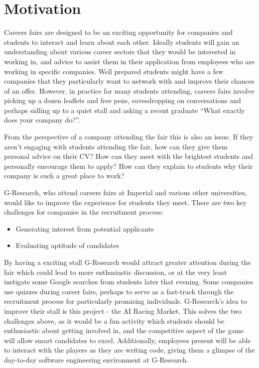 \section{Motivation}
Careers fairs are designed to be an exciting opportunity for companies and students to interact and learn about each other. Ideally students will gain an understanding about various career sectors that they would be interested in working in, and advice to assist them in their application from employees who are working in specific companies. Well prepared students might have a few companies that they particularly want to network with and improve their chances of an offer. However, in practice for many students attending, careers fairs involve picking up a dozen leaflets and free pens, eavesdropping on conversations and perhaps sidling up to a quiet stall and asking a recent graduate ``What exactly does your company do?''.

From the perspective of a company attending the fair this is also an issue. If they aren't engaging with students attending the fair, how can they give them personal advice on their CV? How can they meet with the brightest students and personally encourage them to apply? How can they explain to students why their company is such a great place to work?

G-Research, who attend careers fairs at Imperial and various other universities, would like to improve the experience for students they meet.  There are two key challenges for companies in the recruitment process:
\begin{itemize}
	\item Generating interest from potential applicants
	\item Evaluating aptitude of candidates
\end{itemize}
By having a exciting stall G-Research would attract greater attention during the fair which could lead to more enthusiastic discussion, or at the very least instigate some Google searches from students later that evening. Some companies use quizzes during career fairs, perhaps to serve as a fast-track through the recruitment process for particularly promising individuals. G-Research's idea to improve their stall is this project - the AI Racing Market. This solves the two challenges above, as it would be a fun activity which students should be enthusiastic about getting involved in, and the competitive aspect of the game will allow smart candidates to excel. Additionally, employees present will be able to interact with the players as they are writing code, giving them a glimpse of the day-to-day software engineering environment at G-Research.
